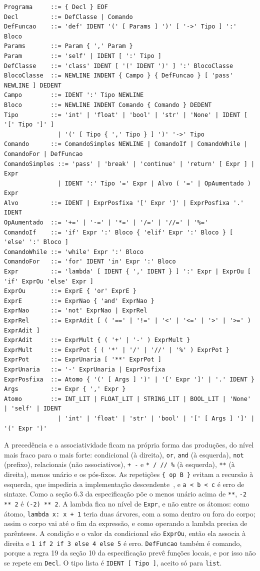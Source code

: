 \documentclass[12pt,a4paper]{article}
\begin{document}
\begin{lstlisting}[style=gram]
Programa     ::= { Decl } EOF
Decl         ::= DefClasse | Comando
DefFuncao    ::= 'def' IDENT '(' [ Params ] ')' [ '->' Tipo ] ':' Bloco
Params       ::= Param { ',' Param }
Param        ::= 'self' | IDENT [ ':' Tipo ]
DefClasse    ::= 'class' IDENT [ '(' IDENT ')' ] ':' BlocoClasse
BlocoClasse  ::= NEWLINE INDENT { Campo } { DefFuncao } [ 'pass' NEWLINE ] DEDENT
Campo        ::= IDENT ':' Tipo NEWLINE
Bloco        ::= NEWLINE INDENT Comando { Comando } DEDENT
Tipo         ::= 'int' | 'float' | 'bool' | 'str' | 'None' | IDENT [ '[' Tipo ']' ]
               | '(' [ Tipo { ',' Tipo } ] ')' '->' Tipo
Comando      ::= ComandoSimples NEWLINE | ComandoIf | ComandoWhile | ComandoFor | DefFuncao
ComandoSimples ::= 'pass' | 'break' | 'continue' | 'return' [ Expr ] | Expr
               | IDENT ':' Tipo '=' Expr | Alvo ( '=' | OpAumentado ) Expr
Alvo         ::= IDENT | ExprPosfixa '[' Expr ']' | ExprPosfixa '.' IDENT
OpAumentado  ::= '+=' | '-=' | '*=' | '/=' | '//=' | '%='
ComandoIf    ::= 'if' Expr ':' Bloco { 'elif' Expr ':' Bloco } [ 'else' ':' Bloco ]
ComandoWhile ::= 'while' Expr ':' Bloco
ComandoFor   ::= 'for' IDENT 'in' Expr ':' Bloco
Expr         ::= 'lambda' [ IDENT { ',' IDENT } ] ':' Expr | ExprOu [ 'if' ExprOu 'else' Expr ]
ExprOu       ::= ExprE { 'or' ExprE }
ExprE        ::= ExprNao { 'and' ExprNao }
ExprNao      ::= 'not' ExprNao | ExprRel
ExprRel      ::= ExprAdit [ ( '==' | '!=' | '<' | '<=' | '>' | '>=' ) ExprAdit ]
ExprAdit     ::= ExprMult { ( '+' | '-' ) ExprMult }
ExprMult     ::= ExprPot { ( '*' | '/' | '//' | '%' ) ExprPot }
ExprPot      ::= ExprUnaria [ '**' ExprPot ]
ExprUnaria   ::= '-' ExprUnaria | ExprPosfixa
ExprPosfixa  ::= Atomo { '(' [ Args ] ')' | '[' Expr ']' | '.' IDENT }
Args         ::= Expr { ',' Expr }
Atomo        ::= INT_LIT | FLOAT_LIT | STRING_LIT | BOOL_LIT | 'None' | 'self' | IDENT
               | 'int' | 'float' | 'str' | 'bool' | '[' [ Args ] ']' | '(' Expr ')'
\end{lstlisting}

A precedência e a associatividade ficam na própria forma das produções,
do nível mais fraco para o mais forte: condicional (à direita),
\texttt{or}, \texttt{and} (à esquerda), \texttt{not} (prefixo),
relacionais (não associativos), \texttt{+ -} e \texttt{* / // \%} (à
esquerda), \texttt{**} (à direita), menos unário e os pós-fixos. As
repetições \texttt{\{ op B \}} evitam a recursão à esquerda, que
impediria a implementação descendente~\cite{appel1998}, e
\texttt{a < b < c} é erro de sintaxe. Como a seção 6.3 da especificação
põe o menos unário acima de \texttt{**}, \texttt{-2 ** 2} é
\texttt{(-2) ** 2}. A lambda fica no nível de \texttt{Expr}, e não
entre os átomos: como átomo, \texttt{lambda x: x + 1} teria duas
árvores, com a soma dentro ou fora do corpo; assim o corpo vai até o
fim da expressão, e como operando a lambda precisa de parênteses. A
condição e o valor da condicional são \texttt{ExprOu}, então ela
associa à direita e \texttt{1 if 2 if 3 else 4 else 5} é erro.
\texttt{DefFuncao} também é comando, porque a regra 19 da seção 10 da
especificação prevê funções locais, e por isso não se repete em
\texttt{Decl}. O tipo lista é \texttt{IDENT [ Tipo ]}, aceito só para
\texttt{list}.
\end{document}
